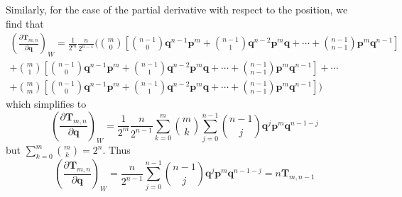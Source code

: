 \documentclass[a4paper]{article}
\theoremstyle{definition}
\begin{document}
Similarly, for the case of the partial derivative with respect to the position, we find that
\begin{multline}
	\left( \frac{\partial\textbf{T}_{m,n}}{\partial\textbf{q}}\right)_W=\frac{1}{2^m}\frac{n}{2^{n-1}}\biggl(\binom{m}{0}\left[\binom{n-1}{0}\textbf{q}^{n-1}\textbf{p}^m+\binom{n-1}{1}\textbf{q}^{n-2}\textbf{p}^m\textbf{q}+\cdots+\binom{n-1}{n-1}\textbf{p}^m\textbf{q}^{n-1}\right]\\+\binom{m}{1}\left[\binom{n-1}{0}\textbf{q}^{n-1}\textbf{p}^m+\binom{n-1}{1}\textbf{q}^{n-2}\textbf{p}^m\textbf{q}+\cdots+\binom{n-1}{n-1}\textbf{p}^m\textbf{q}^{n-1}\right]+\cdots\\+\binom{m}{m}\left[\binom{n-1}{0}\textbf{q}^{n-1}\textbf{p}^m+\binom{n-1}{1}\textbf{q}^{n-2}\textbf{p}^m\textbf{q}+\cdots+\binom{n-1}{n-1}\textbf{p}^m\textbf{q}^{n-1}\right]\biggr) 
\end{multline}
which simplifies to
\begin{equation}
	\left( \frac{\partial\textbf{T}_{m,n}}{\partial\textbf{q}}\right)_W=\frac{1}{2^m}\frac{n}{2^{n-1}}\sum_{k=0}^m\binom{m}{k}\sum_{j=0}^{n-1}\binom{n-1}{j}\textbf{q}^j\textbf{p}^{m}\textbf{q}^{n-1-j}
\end{equation}
but $\displaystyle\sum_{k=0}^m\binom{m}{k}=2^n$. Thus
\begin{equation}
	\left( \frac{\partial\textbf{T}_{m,n}}{\partial\textbf{q}}\right)_W=\frac{n}{2^{n-1}}
	\sum_{j=0}^{n-1}\binom{n-1}{j}\textbf{q}^j\textbf{p}^{m}\textbf{q}^{n-1-j}=n\textbf{T}_{m,n-1}
\end{equation}
\end{document}
